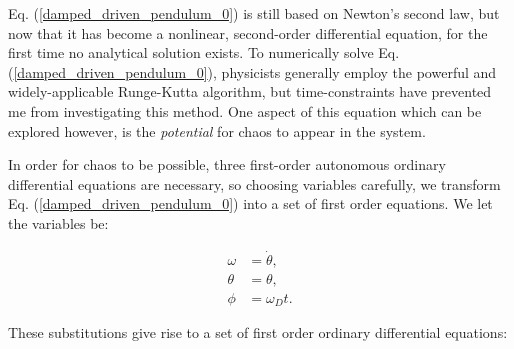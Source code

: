 \documentclass[12pt,twoside]{reedthesis}
\begin{document}
Eq. (\ref{damped_driven_pendulum_0}) is still based on Newton's second law, but now that it has become a nonlinear, second-order differential equation, for the first time no analytical solution exists.  To numerically solve Eq. (\ref{damped_driven_pendulum_0}), physicists generally employ the powerful and widely-applicable Runge-Kutta algorithm, but time-constraints have prevented me from investigating this method.  One aspect of this equation which can be explored however, is the \textit{potential} for chaos to appear in the system.  

In order for chaos to be possible, three first-order autonomous ordinary differential equations are necessary, so choosing variables carefully, we transform Eq. (\ref{damped_driven_pendulum_0}) into a set of first order equations.  We let the variables be: 

\begin{align}
\label{first_order_ode_substitutions}
\omega & = \dot{\theta}, \\
\theta & = \theta, \\
\phi & = \omega_D t.
\end{align}

These substitutions give rise to a set of first order ordinary differential equations:







\end{document}
